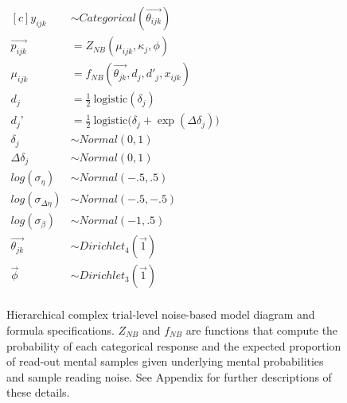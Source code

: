 \begin{figure}
\begin{minipage}{.5\textwidth}
  \end{minipage}%
  \begin{minipage}{.5\textwidth}
    \centering
    $
\begin{aligned}[c]
  y_{ijk} &\sim Categorical(\overrightarrow{\theta_{ijk}}) \\
  \overrightarrow{p_{ijk}} &= Z_{NB}(\mu_{ijk},\kappa_j, \phi) \\
  \mu_{ijk} &= f_{NB}(\overrightarrow{\theta_{jk}}, d_j, d'_j, x_{ijk})  \\
  d_j &= \frac{1}{2} \ \text{logistic}(\delta_j) \\
  d_j’ &= \frac{1}{2} \ \text{logistic}\big(\delta_j + \exp(\Delta\delta_j)\big) \\
  \delta_j &\sim Normal(0,1) \\
  \Delta\delta_j &\sim Normal(0,1) \\
  log(\sigma_{\eta}) &\sim Normal(-.5, .5) \\
  log(\sigma_{\Delta\eta}) &\sim Normal(-.5, -.5) \\
  log(\sigma_{\beta}) &\sim Normal(-1, .5) \\
  \overrightarrow{\theta_{jk}} &\sim Dirichlet_4(\overrightarrow{1}) \\
  \overrightarrow{\phi} &\sim Dirichlet_3(\overrightarrow{1}) \\
\end{aligned}
$
  \end{minipage}
  \caption{Hierarchical complex trial-level noise-based model diagram and formula specifications. $Z_{NB}$ and $f_{NB}$ are functions that compute the probability of each categorical response and the expected proportion of read-out mental samples given underlying mental probabilities and sample reading noise. See Appendix for further descriptions of these details.}
\end{figure}